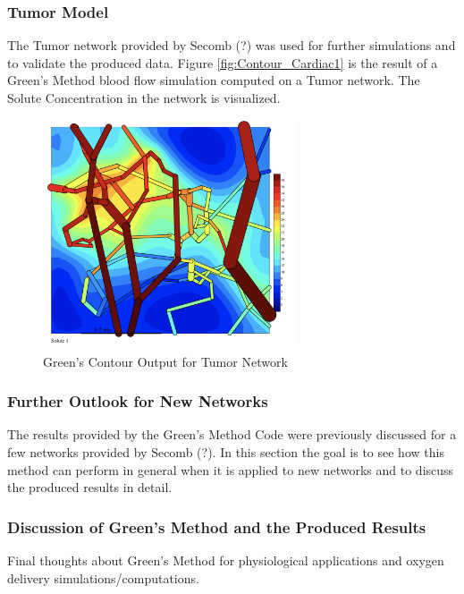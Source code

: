 \subsubsection*{Tumor Model}

The Tumor network provided by Secomb (?) was used for further simulations and to validate the produced data.
Figure \ref{fig:Contour_Cardiac1}  is the result of a Green's Method blood flow simulation computed on a Tumor network. The Solute Concentration in the network is visualized.\\
\begin{figure}[h]
\centering
\includegraphics[width=75mm]{Contour_Tumor}
\caption{\footnotesize Green's Contour Output for Tumor Network}
\label{fig:Contour_Tumor}
\end{figure}

\subsubsection*{Further Outlook for New Networks}

The results provided by the Green's Method Code were previously discussed for a few networks provided by Secomb (?). In this section the goal is to see how this method can perform in general when it is applied to new networks and to discuss the produced results in detail.

\subsubsection{Discussion of Green's Method and the Produced Results}

Final thoughts about Green's Method for physiological applications and oxygen delivery simulations/computations.

